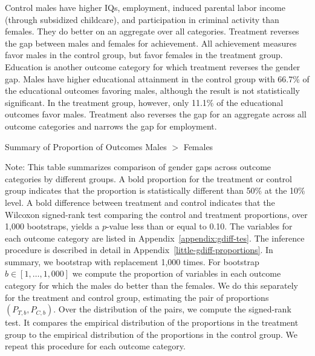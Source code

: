 Control males have higher IQs, employment, induced parental labor income (through subsidized childcare), and participation in criminal activity than females. They do better on an aggregate over all categories. Treatment reverses the gap between males and females for achievement. All achievement measures favor males in the control group, but favor females in the treatment group. Education is another outcome category for which treatment reverses the gender gap. Males have higher educational attainment in the control group with 66.7\% of the educational outcomes favoring males, although the result is not statistically significant. In the treatment group, however, only 11.1\% of the educational outcomes favor males. Treatment also reverses the gap for an aggregate across all outcome categories and narrows the gap for employment.

\begin{table}[H]
\centering
\caption{Summary of Proportion of Outcomes Males $>$ Females}
\label{tab:proportion-table-ranksign}
\begin{threeparttable}

\begin{tablenotes}
\footnotesize
\item Note: This table summarizes comparison of gender gaps across outcome categories by different groups. A bold proportion for the treatment or control group indicates that the proportion is statistically different than 50\% at the 10\% level. A bold difference between treatment and control indicates that the Wilcoxon signed-rank test comparing the control and treatment proportions, over 1,000 bootstraps, yields a $p$-value less than or equal to 0.10. The variables for each outcome category are listed in Appendix~\ref{appendix:gdiff-tes}. The inference procedure is described in detail in Appendix~\ref{little-gdiff-proportions}. In summary, we bootstrap with replacement 1,000 times. For bootstrap $b \in [1, \ldots, 1,000]$ we compute the proportion of variables in each outcome category for which the males do better than the females. We do this separately for the treatment and control group, estimating the pair of proportions $(P_{T,b}, P_{C,b})$. Over the distribution of the pairs, we compute the signed-rank test. It compares the empirical distribution of the proportions in the treatment group to the empirical distribution of the proportions in the control group. We repeat this procedure for each outcome category.
\end{tablenotes}
\end{threeparttable}
\end{table}

